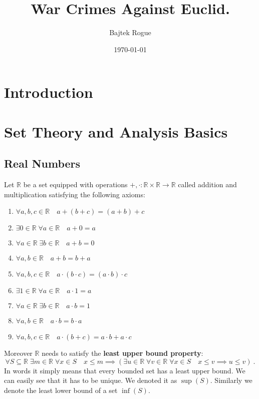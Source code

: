 \documentclass[a4paper,12pt]{report}
\title{War Crimes Against Euclid.}
\author{Bajtek Rogue}
\date{\today}
\begin{document}
\maketitle
\tableofcontents
\newpage

\chapter{Introduction}


\chapter{Set Theory and Analysis Basics}

\section{Real Numbers}

Let $\mathbb{R}$ be a set equipped with operations $+,\cdot:\mathbb{R}\times\mathbb{R}\to\mathbb{R}$ called addition and multiplication satisfying the following axioms:
\begin{enumerate}
  \item $\forall a,b,c \in \mathbb{R} \quad a+(b+c)=(a+b)+c$
  \item $\exists 0\in\mathbb{R} \; \forall a\in\mathbb{R} \quad a+0=a$
  \item $\forall a\in\mathbb{R} \; \exists b\in\mathbb{R} \quad a+b=0$
  \item $\forall a,b\in\mathbb{R} \quad a+b=b+a$
  \item $\forall a,b,c \in \mathbb{R} \quad a\cdot(b\cdot c)=(a\cdot b)\cdot c$
  \item $\exists 1\in\mathbb{R} \; \forall a\in\mathbb{R} \quad a\cdot1=a$
  \item $\forall a\in\mathbb{R} \; \exists b\in\mathbb{R} \quad a\cdot b=1$
  \item $\forall a,b\in\mathbb{R} \quad a\cdot b=b\cdot a$
  \item $\forall a,b,c\in\mathbb{R} \quad a\cdot(b+c)=a\cdot b + a \cdot c$
\end{enumerate}
Moreover $\mathbb{R}$ needs to satisfy the \textbf{least upper bound property}:
\[
  \forall S \subseteq\mathbb{R} \; \exists m \in\mathbb{R} \; \forall x \in S \quad x \le m \implies (\exists u\in\mathbb{R} \; \forall v \in \mathbb{R} \; \forall x\in S \quad x \le v \implies u \le v) ~.
\]
In words it simply means that every bounded set has a least upper bound. We can easily see that it has to be unique. We denoted it as $\sup(S)$. Similarly we denote the least lower bound of a set $\inf(S)$.
\end{document}
